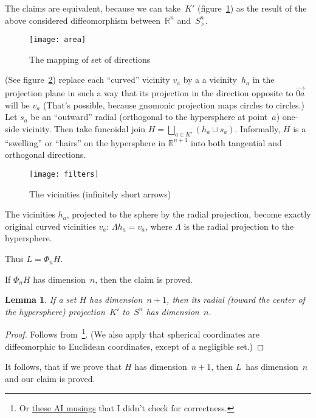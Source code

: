\documentclass[oneside,draft]{amsart}
\newtheorem{lem}{Lemma}
\begin{document}
The claims are equivalent, because we can take~$K'$ (figure~\ref{fig:area}) as the result of the above considered diffeomorphism between~$\mathbb{R}^n$ and~$S^n_{>}$.

\begin{figure}[hbt]
    \centering
    \texttt{[image: area]}
    \caption{The mapping of set of directions}
    \label{fig:area}
\end{figure}

(See figure~\ref{fig:filters}) replace each ``curved'' vicinity $v_a$ by a a vicinity~$h_a$ in the projection plane in such a way that its projection in the direction opposite to $\vec{0a}$ will be $v_a$ (That's possible, because gnomonic projection maps circles to circles.) Let $s_a$ be an ``outward'' radial (orthogonal to the hypersphere at point~$a$) one-si\-de vicinity. Then take funcoidal join $H=\bigsqcup_{a\in K'}(h_a\sqcup s_a)$. Informally, $H$ is a ``swelling'' or ``hairs'' on the hypersphere in $\mathbb{R}^{n+1}$ into both tangential and orthogonal directions.

\begin{figure}[hbt]
    \centering
    \texttt{[image: filters]}
    \caption{The vicinities (infinitely short arrows)}
    \label{fig:filters}
\end{figure}

The vicinities $h_a$, projected to the sphere by the radial projection, become exactly original curved vicinities $v_a$: $\Lambda h_a=v_a$, where $\Lambda$ is the radial projection to the hypersphere.

Thus $L = \Phi_n H$.

If $\Phi_n H$ has dimension~$n$, then the claim is proved.

\begin{lem}
If a set $H$ has dimension~$n+1$, then its radial (toward the center of the hypersphere) projection~$K'$ to~$S^n$ has dimension~$n$.
\end{lem}

\begin{proof}
Follows from~\cite{189275}\footnote{Or \href{https://grok.com/share/bGVnYWN5_2e0aef8b-4309-420f-815c-a09d76ae97c1}{these AI musings}
that I didn't check for correctness.}.
(We also apply that spherical coordinates are diffeomorphic to Euclidean coordinates, except of a negligible set.)
\end{proof}

It follows, that if we prove that $H$ has dimension~$n+1$, then $L$~has dimension~$n$ and our claim is proved.
\end{document}
